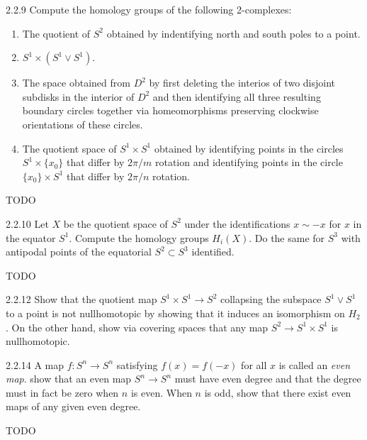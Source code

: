 \documentclass{article}
\begin{document}
\begin{exercise}{2.2.9}{\parindent}
  Compute the homology groups of the following 2-complexes:
  \begin{enumerate}
  \item The quotient of $S^2$ obtained by indentifying north and south
    poles to a point.
  \item $S^1 \times (S^1 \vee S^1)$.
  \item The space obtained from $D^2$ by first deleting the interios
    of two disjoint subdisks in the interior of $D^2$ and then
    identifying all three resulting boundary circles together via
    homeomorphisms preserving clockwise orientations of these circles.
  \item The quotient space of $S^1 \times S^1$ obtained by identifying
    points in the circles $S^1 \times \{x_0\}$ that differ by $2\pi/m$
    rotation and identifying points in the circle $\{x_0\} \times S^1$
    that differ by $2\pi/n$ rotation.
  \end{enumerate}
\end{exercise}
\begin{solution}{\parindent}
  TODO
\end{solution}

\begin{exercise}{2.2.10}{\parindent}
  Let $X$ be the quotient space of $S^2$ under the identifications $x
  \sim -x$ for $x$ in the equator $S^1$. Compute the homology groups
  $H_i(X)$. Do the same for $S^3$ with antipodal points of the
  equatorial $S^2 \subset S^3$ identified.
\end{exercise}
\begin{solution}{\parindent}
  TODO
\end{solution}

\begin{exercise}{2.2.12}{\parindent}
  Show that the quotient map $S^1 \times S^1 \to S^2$ collapsing the
  subspace $S^1 \vee S^1$ to a point is not nullhomotopic by showing
  that it induces an isomorphism on $H_2$. On the other hand, show via
  covering spaces that any map $S^2 \to S^1 \times S^1$ is
  nullhomotopic.
\end{exercise}

\begin{exercise}{2.2.14}{\parindent}
  A map $f: S^n \to S^n$ satisfying $f(x) = f(-x)$ for all $x$ is
  called an \textit{even map}. show that an even map $S^n \to S^n$
  must have even degree and that the degree must in fact be zero when
  $n$ is even. When $n$ is odd, show that there exist even maps of any
  given even degree.
\end{exercise}
\begin{solution}{\parindent}
  TODO
\end{solution}
\end{document}
